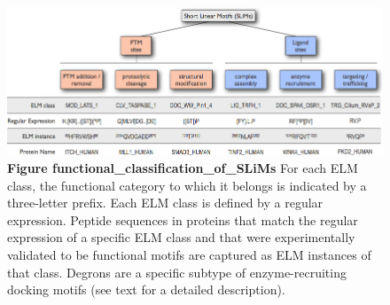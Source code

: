 \begin{figure}[h!]
\centering
\includegraphics[width=\textwidth]{Figures/Introduction/functional_classification_of_SLiMs.png}
\caption{
\textbf{Figure functional\_classification\_of\_SLiMs}
For each ELM class, the functional category to which it belongs is indicated by
a three-letter prefix. Each ELM class is defined by a regular expression.
Peptide sequences in proteins that match the regular expression of a specific
ELM class and that were experimentally validated to be functional motifs are
captured as ELM instances of that class. Degrons are a specific subtype of
enzyme-recruiting docking motifs (see text for a detailed description).
}
\label{fig:SLiMclasses}
\end{figure}
